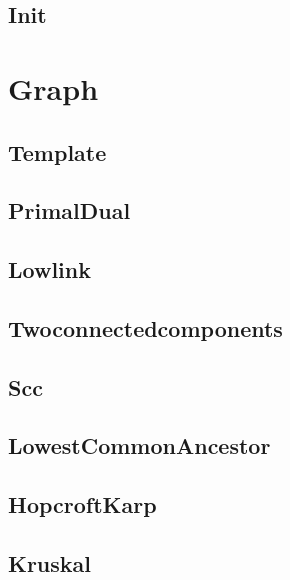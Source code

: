 \documentclass[titlepage, landscape, a4paper, twocolumn, 10pt]{ujarticle}
\begin{document}
\subsection{Init}



\section{Graph}

\subsection{Template}


\subsection{PrimalDual}


\subsection{Lowlink}


\subsection{Twoconnectedcomponents}


\subsection{Scc}


\subsection{LowestCommonAncestor}


\subsection{HopcroftKarp}


\subsection{Kruskal}

\end{document}
